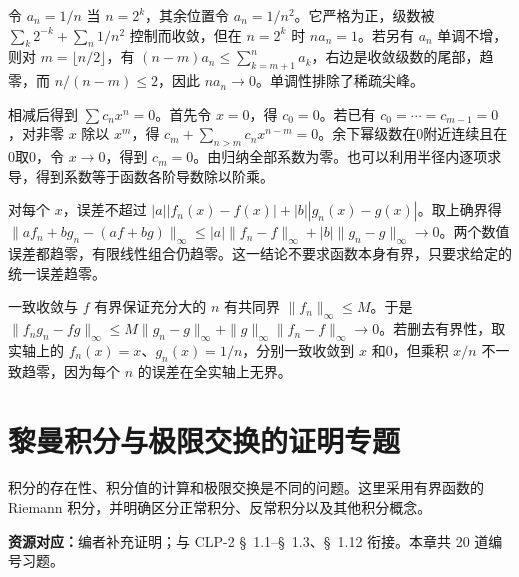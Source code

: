 \documentclass[UTF8,12pt,a4paper,fontset=fandol]{ctexart}
\begin{document}
\begin{solve}\label{ans:c29q17}
令 $a_n=1/n$ 当 $n=2^k$，其余位置令 $a_n=1/n^2$。它严格为正，级数被 $\sum_k2^{-k}+\sum_n1/n^2$ 控制而收敛，但在 $n=2^k$ 时 $na_n=1$。若另有 $a_n$ 单调不增，则对 $m=\lfloor n/2\rfloor$，有 $(n-m)a_n\le\sum_{k=m+1}^na_k$，右边是收敛级数的尾部，趋零，而 $n/(n-m)\le2$，因此 $na_n\to0$。单调性排除了稀疏尖峰。
\end{solve}

\begin{solve}\label{ans:c29q18}
相减后得到 $\sum c_nx^n=0$。首先令 $x=0$，得 $c_0=0$。若已有 $c_0=\cdots=c_{m-1}=0$，对非零 $x$ 除以 $x^m$，得 $c_m+\sum_{n>m}c_nx^{n-m}=0$。余下幂级数在0附近连续且在0取0，令 $x\to0$，得到 $c_m=0$。由归纳全部系数为零。也可以利用半径内逐项求导，得到系数等于函数各阶导数除以阶乘。
\end{solve}

\begin{solve}\label{ans:c29q19}
对每个 $x$，误差不超过 $|a||f_n(x)-f(x)|+|b||g_n(x)-g(x)|$。取上确界得 $\|af_n+bg_n-(af+bg)\|_\infty\le|a|\|f_n-f\|_\infty+|b|\|g_n-g\|_\infty\to0$。两个数值误差都趋零，有限线性组合仍趋零。这一结论不要求函数本身有界，只要求给定的统一误差趋零。
\end{solve}

\begin{solve}\label{ans:c29q20}
一致收敛与 $f$ 有界保证充分大的 $n$ 有共同界 $\|f_n\|_\infty\le M$。于是 $\|f_ng_n-fg\|_\infty\le M\|g_n-g\|_\infty+\|g\|_\infty\|f_n-f\|_\infty\to0$。若删去有界性，取实轴上的 $f_n(x)=x$、$g_n(x)=1/n$，分别一致收敛到 $x$ 和0，但乘积 $x/n$ 不一致趋零，因为每个 $n$ 的误差在全实轴上无界。
\end{solve}

\clearpage
\section{黎曼积分与极限交换的证明专题}\label{sec:ch30}
积分的存在性、积分值的计算和极限交换是不同的问题。这里采用有界函数的 Riemann 积分，并明确区分正常积分、反常积分以及其他积分概念。

\textbf{资源对应：}编者补充证明；与 CLP-2 \S~1.1--\S~1.3、\S~1.12 衔接。本章共 20 道编号习题。
\end{document}
